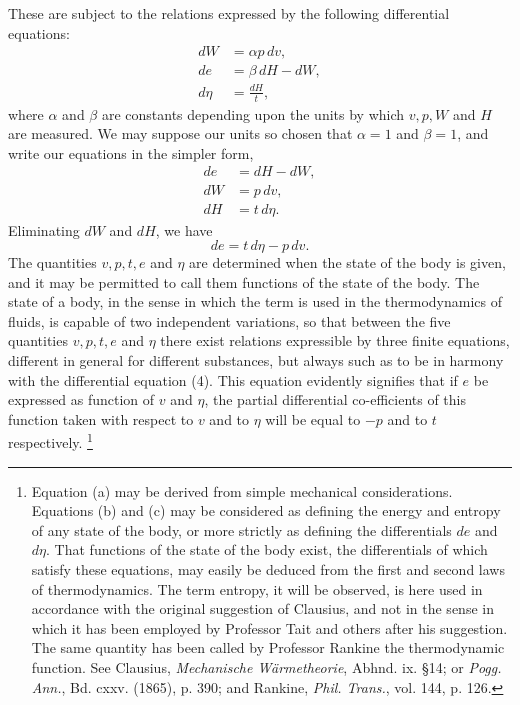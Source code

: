 \documentclass[11pt]{article}
\begin{document}
These are subject to the relations expressed by the following differential equations:
\begin{align}
dW &= \alpha p\,dv, \tag{a}\\
de &= \beta\,dH-dW, \tag{b}\\
d\eta &= \frac{dH}{t}, \tag{c}
\end{align}
where $\alpha$ and $\beta$ are constants depending upon the units by which $v,p,W$ and $H$ are measured. We may suppose our units so chosen that $\alpha=1$ and $\beta=1$, and write our equations in the simpler form,
\begin{align}
de &= dH-dW, \tag{1}\\
dW &= p\,dv, \tag{2}\\
dH &= t\,d\eta. \tag{3}
\end{align}
Eliminating $dW$ and $dH$, we have
\begin{equation}
de=t\,d\eta-p\,dv. \tag{4}
\end{equation}
The quantities $v,p,t,e$ and $\eta$ are determined when the state of the body is given, and it may be permitted to call them functions of the state of the body. The state of a body, in the sense in which the term is used in the thermodynamics of fluids, is capable of two independent variations, so that between the five quantities $v,p,t,e$ and $\eta$ there exist relations expressible by three finite equations, different in general for different substances, but always such as to be in harmony with the differential equation (4). This equation evidently signifies that if $e$ be expressed as function of $v$ and $\eta$, the partial differential co-efficients of this function taken with respect to $v$ and to $\eta$ will be equal to $-p$ and to $t$ respectively.
\footnote{Equation (a) may be derived from simple mechanical considerations. Equations (b) and (c) may be considered as defining the energy and entropy of any state of the body, or more strictly as defining the differentials $de$ and $d\eta$. That functions of the state of the body exist, the differentials of which satisfy these equations, may easily be deduced from the first and second laws of thermodynamics. The term entropy, it will be observed, is here used in accordance with the original suggestion of Clausius, and not in the sense in which it has been employed by Professor Tait and others after his suggestion. The same quantity has been called by Professor Rankine the thermodynamic function. See Clausius, \emph{Mechanische W\"armetheorie}, Abhnd. ix. \S 14; or \emph{Pogg. Ann.}, Bd. cxxv. (1865), p. 390; and Rankine, \emph{Phil. Trans.}, vol. 144, p. 126.}
\end{document}
